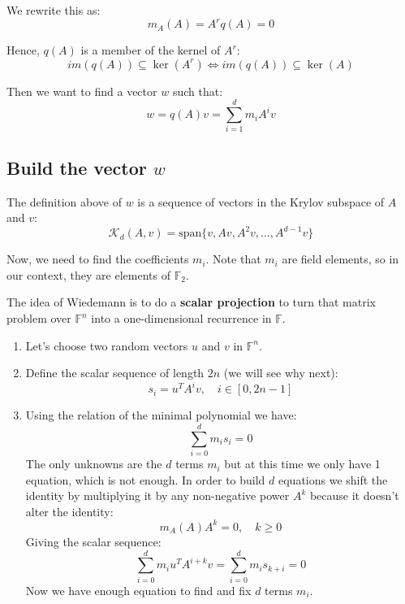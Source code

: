 \documentclass[a4paper, 11pt]{article}
\begin{document}
We rewrite this as:
\begin{equation}
    m_A(A) = A^r q(A) = 0
\end{equation}

Hence, $q(A)$ is a member of the kernel of $A^r$:
\begin{equation}
    im(q(A)) \subseteq \ker(A^r) \iff im(q(A)) \subseteq \ker(A)
\end{equation}

Then we want to find a vector $w$ such that:
\begin{equation}
    w = q(A)v = \sum^d_{i=1} m_i A^i v
\end{equation}

\subsection{Build the vector $w$}

The definition above of $w$ is a sequence of vectors in the Krylov subspace of $A$ and $v$:
\begin{equation}
    \mathcal{K}_d(A,v) = \mathrm{span}\{v, Av, A^2v, \dots, A^{d-1}v\}
\end{equation}

Now, we need to find the coefficients $m_i$. Note that $m_i$ are field elements, so in our context, they are elements of $\mathbb{F}_2$.

The idea of Wiedemann is to do a \textbf{scalar projection} to turn that matrix problem over $\mathbb{F}^n$ into a one-dimensional recurrence in $\mathbb{F}$.

\begin{enumerate}
    \item Let's choose two random vectors $u$ and $v$ in $\mathbb{F}^{n}$.
    \item Define the scalar sequence of length $2n$ (we will see why next): $$s_i = u^TA^iv, \quad i \in [0, 2n-1]$$
    \item Using the relation of the minimal polynomial we have:
    $$\sum^d_{i=0} m_i s_{i} = 0$$
    The only unknowns are the $d$ terms $m_i$ but at this time we only have 1 equation, which is not enough. In order to build $d$ equations we shift the identity by multiplying it by any non-negative power $A^k$ because it doesn't alter the identity:
    $$m_A(A)A^k=0, \quad k \ge 0$$
    Giving the scalar sequence:
    $$\sum^d_{i=0} m_i u^T A^{i+k}v = \sum^d_{i=0} m_i s_{k+i} = 0$$
    Now we have enough equation to find and fix $d$ terms $m_i$.
\end{enumerate}
\end{document}
